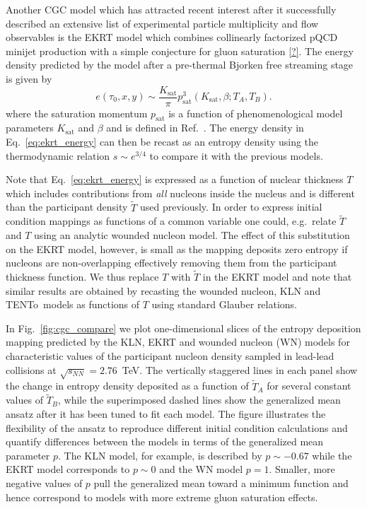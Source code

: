 \documentclass[aps,prc,reprint,amsmath,nofootinbib,superscriptaddress]{revtex4-1}
\newcommand{\trento}{T\raisebox{-0.5ex}{R}ENTo}
\newcommand{\sqrts}{\sqrt{s_{NN}}}
\newcommand{\T}{\tilde{T}}
\begin{document}
Another CGC model which has attracted recent interest after it successfully described an extensive list of experimental particle multiplicity and flow observables is the EKRT model which combines collinearly factorized pQCD minijet production with a simple conjecture for gluon saturation \ref{?}.
The energy density predicted by the model after a pre-thermal Bjorken free streaming stage is given by
\begin{equation}
  e(\tau_0, x, y) \sim \frac{K_\text{sat}}{\pi} p_\text{sat}^3(K_\text{sat}, \beta; T_A, T_B).
  \label{eq:ekrt_energy}
\end{equation}
where the saturation momentum $p_\text{sat}$ is a function of phenomenological model parameters $K_\text{sat}$ and $\beta$ and is defined in Ref.~\cite{Niemi:2015qia}.
The energy density in Eq.~\eqref{eq:ekrt_energy} can then be recast as an entropy density using the thermodynamic relation ${s \sim e^{3/4}}$ to compare it with the previous models.

Note that Eq.~\eqref{eq:ekrt_energy} is expressed as a function of nuclear thickness $T$ which includes contributions from \emph{all} nucleons inside the nucleus and is different than the participant density $\T$ used previously.
In order to express initial condition mappings as functions of a common variable one could, e.g.\ relate $\T$ and $T$ using an analytic wounded nucleon model.
The effect of this substitution on the EKRT model, however, is small as the mapping deposits zero entropy if nucleons are non-overlapping effectively removing them from the participant thickness function.
We thus replace $T$ with $\T$ in the EKRT model and note that similar results are obtained by recasting the wounded nucleon, KLN and \trento\ models as functions of $T$ using standard Glauber relations.

In Fig.~\ref{fig:cgc_compare} we plot one-dimensional slices of the entropy deposition mapping predicted by the KLN, EKRT and wounded nucleon (WN) models for characteristic values of the participant nucleon density sampled in lead-lead collisions at $\sqrts=2.76$~TeV.
The vertically staggered lines in each panel show the change in entropy density deposited as a function of $\T_A$ for several constant values of $\T_B$, while the superimposed dashed lines show the generalized mean ansatz after it has been tuned to fit each model.
The figure illustrates the flexibility of the ansatz to reproduce different initial condition calculations and quantify differences between the models in terms of the generalized mean parameter $p$.
The KLN model, for example, is described by $p\sim-0.67$ while the EKRT model corresponds to $p \sim 0$ and the WN model $p=1$.
Smaller, more negative values of $p$ pull the generalized mean toward a minimum function and hence correspond to models with more extreme gluon saturation effects.
\end{document}
